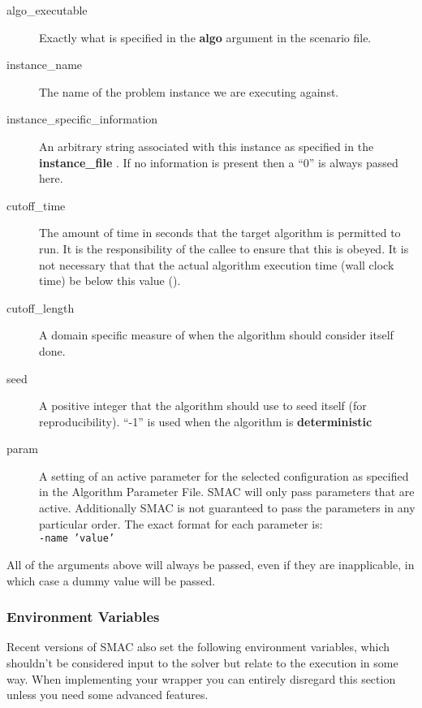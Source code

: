 \documentclass[manual.tex]{subfiles}
\begin{document}
\begin{description}
\item [{algo\_executable}] Exactly what is specified in the \textbf{algo} argument in the scenario file.
 
\item [{instance\_name}] The name of the problem instance we are executing
against.

\item [{instance\_specific\_information}] An arbitrary string associated
with this instance as specified in the \textbf{instance\_file }. If
no information is present then a ``0'' is always passed here. 

\item [{cutoff\_time}] The amount of time in seconds that the target algorithm
is permitted to run. It is the responsibility of the callee
to ensure that this is obeyed. It is not necessary that that the actual
algorithm execution time (wall clock time) be below this value ().

\item [{cutoff\_length}] A domain specific measure of when the algorithm should consider itself done.

\item [{seed}] A positive integer that the algorithm should use to seed
itself (for reproducibility). ``-1'' is used when the algorithm is \textbf{deterministic}

\item [{param}] A setting of an active parameter for the selected configuration
as specified in the Algorithm Parameter File. SMAC will only pass
parameters that are active. Additionally SMAC is not guaranteed
to pass the parameters in any particular order. The exact format for
each parameter is:\\
\texttt{-name~'value'}

\end{description}

All of the arguments above will always be passed, even if they are inapplicable, in which case a dummy value will be passed. \\
\subsubsection*{Environment Variables}
\label{sec:exec-env}
Recent versions of SMAC also set the following environment variables, which shouldn't be considered input to the solver but  relate to the execution in some way. When implementing your wrapper you can entirely disregard this section unless you need some advanced features.
\end{document}
